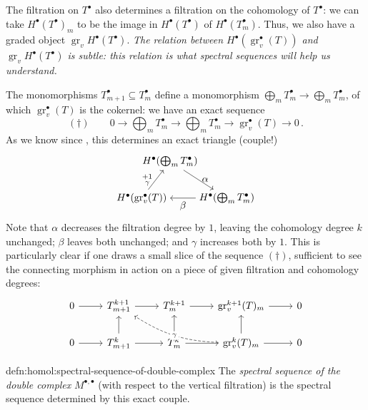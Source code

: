 The filtration on $T^\bullet$ also determines a filtration on the
cohomology of $T^\bullet$: we can take $H^\bullet(T^\bullet)_m$ to be
the image in $H^\bullet(T^\bullet)$ of $H^\bullet(T_m^\bullet)$.
Thus, we also have a graded object
$\operatorname{gr}_v H^\bullet(T^\bullet)$. \emph{The relation between
  $H^\bullet(\operatorname{gr}_v^\bullet(T))$ and
  $\operatorname{gr}_v H^\bullet(T^\bullet)$ is subtle: this relation
  is what spectral sequences will help us understand.}

The monomorphisms $T_{m+1}^\bullet \subseteq T_m^\bullet$ define a
monomorphism $\bigoplus_m T_m^\bullet \to \bigoplus_m T_m^\bullet$, of
which $\operatorname{gr}_v^\bullet(T)$ is the cokernel: we have an
exact sequence
\[
  (\dagger) \qquad 0 \longrightarrow \bigoplus_m T_m^\bullet
  \longrightarrow \bigoplus_m T_m^\bullet \longrightarrow
  \operatorname{gr}_v^\bullet(T) \longrightarrow 0 \, .
\]
As we know since
, this
determines an exact triangle (couple!)
\[
  \begin{tikzpicture}[baseline=(current bounding box.center)]
    \node (A) at (1,1.3) {$H^\bullet(\bigoplus_m
      T_m^\bullet)$}; \node (E) at (0,0)
    {$H^\bullet(\operatorname{gr}_v^\bullet(T))$}; \node (A2) at (3,0)
    {$H^\bullet(\bigoplus_m
      T_m^\bullet)$}; \draw[->] (A) -- (A2) node[midway, right]
    {$\alpha$}; \draw[->] (A2) -- (E) node[midway, below]
    {$\beta$}; \draw[->] (E) -- (A) node[midway, left]
    {$\substack{+1\\\gamma}$};
  \end{tikzpicture}
\]
Note that $\alpha$ decreases the filtration degree by $1$, leaving the
cohomology degree $k$ unchanged; $\beta$ leaves both unchanged; and
$\gamma$ increases both by $1$. This is particularly clear if one
draws a small slice of the sequence $(\dagger)$, sufficient to see the
connecting morphism in action on a piece of given filtration and
cohomology degrees:
\[\begin{tikzcd}
    0 \arrow[r] & T_{m+1}^{k+1} \arrow[r] & T_m^{k+1} \arrow[r] &
    \operatorname{gr}_v^{k+1}(T)_m \arrow[r] & 0 \\
    0 \arrow[r] & T_{m+1}^k \arrow[r] \arrow[u] & T_m^k \arrow[r]
    \arrow[u] & \operatorname{gr}_v^k(T)_m \arrow[r] \arrow[u]
    \arrow[from=2-4,to=1-2,dashed,"\gamma" description, bend left=15]
    & 0
  \end{tikzcd}\]

\begin{defn}{}{defn:homol:spectral-sequence-of-double-complex}
  The \emph{spectral sequence of the double complex}
  $M^{\bullet,\bullet}$ (with respect to the vertical filtration) is
  the spectral sequence determined by this exact couple.
\end{defn}

